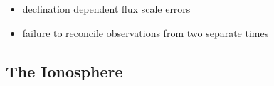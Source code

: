 \documentclass[twocolumn]{aastex6}
\newcommand{\todo}[1]{\textcolor{red}{TODO: #1}\PackageWarning{TODO:}{#1!}}
\begin{document}
\begin{itemize}
    \item declination dependent flux scale errors
    \item failure to reconcile observations from two separate times
\end{itemize}

\subsection{The Ionosphere}

%
%
%
%
\end{document}
